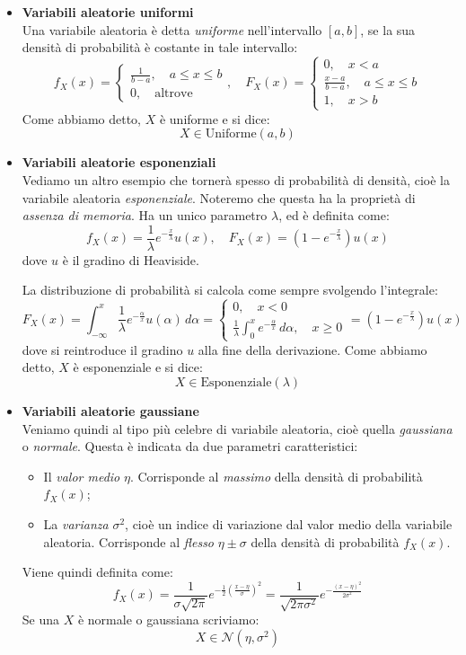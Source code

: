 \documentclass[a4paper,11pt]{article}
\begin{document}
\begin{itemize}
	\item \textbf{\textsf{Variabili aleatorie uniformi}} \\
Una variabile aleatoria è detta \textit{uniforme} nell'intervallo $[a, b]$, se la sua densità di probabilità è costante in tale intervallo:
$$
f_X(x) = 
\begin{cases}
	\frac{1}{b-a}, \quad a \leq x \leq b \\
	0, \quad \text{altrove}
\end{cases}, \quad
F_X(x) = 
\begin{cases}
	0, \quad x < a \\
	\frac{x - a}{b-a}, \quad a \leq x \leq b \\
	1, \quad x > b 
\end{cases}
$$
Come abbiamo detto, $X$ è uniforme e si dice:
$$
X \in \mathrm{Uniforme}(a, b)
$$

	\item \textbf{\textsf{Variabili aleatorie esponenziali}} \\
Vediamo un altro esempio che tornerà spesso di probabilità di densità, cioè la variabile aleatoria \textit{esponenziale}. Noteremo che questa ha la proprietà di \textit{assenza di memoria}. Ha un unico parametro $\lambda$, ed è definita come:
$$
f_X(x) = \frac{1}{\lambda} e^{-\frac{x}{\lambda}} u(x)
, \quad
F_X(x) = \left( 1 - e^{-\frac{x}{\lambda}} \right) u(x)
$$
dove $u$ è il gradino di Heaviside.

La distribuzione di probabilità si calcola come sempre svolgendo l'integrale:
$$
F_X(x) =
\int_{-\infty}^x \frac{1}{\lambda} e^{-\frac{\alpha}{x}} u(\alpha) \, d\alpha =
\begin{cases}
	0, \quad x < 0 \\
	\frac{1}{\lambda} \int_0^x e^{-\frac{\alpha}{x}} \, d\alpha, \quad x \geq 0
\end{cases} 
= \left( 1 - e^{-\frac{x}{\lambda}} \right) u(x)
$$
dove si reintroduce il gradino $u$ alla fine della derivazione. Come abbiamo detto, $X$ è esponenziale e si dice:
$$
X \in \mathrm{Esponenziale}(\lambda)
$$
	
\item \textbf{\textsf{Variabili aleatorie gaussiane}} \\
Veniamo quindi al tipo più celebre di variabile aleatoria, cioè quella \textit{gaussiana} o \textit{normale}. Questa è indicata da due parametri caratteristici:
\begin{itemize}
	\item Il \textit{valor medio} $\eta$. Corrisponde al \textit{massimo} della densità di probabilità $f_X(x)$;
	\item La \textit{varianza} $\sigma^2$, cioè un indice di variazione dal valor medio della variabile aleatoria. Corrisponde al \textit{flesso} $\eta \pm \sigma$ della densità di probabilità $f_X(x)$.
\end{itemize}
Viene quindi definita come:
$$
f_X(x) = \frac{1}{\sigma \sqrt{2 \pi}} e^{-\frac{1}{2} \left( \frac{x - \eta}{\sigma} \right)^2} = \frac{1}{\sqrt{2 \pi \sigma^2}} e^{- \frac{(x - \eta)^2}{2\sigma^2}}
$$
Se una $X$ è normale o gaussiana scriviamo:
$$
X \in \mathcal{N}(\eta, \sigma^2)
$$


\end{itemize}
\end{document}

